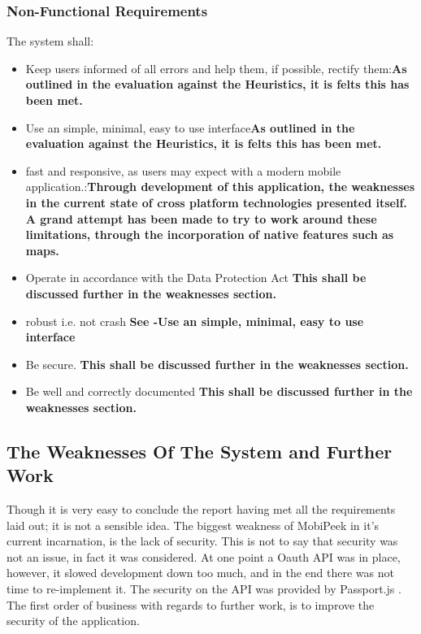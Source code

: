 \documentclass[a4paper]{article}
\begin{document}
\subsubsection{Non-Functional Requirements}
The system shall:
\begin{itemize}
\item Keep users informed of all errors and help them, if possible, rectify them:\textbf{As outlined in the evaluation against the Heuristics, it is felts this has been met.} 
\item Use an simple, minimal, easy to use interface\textbf{As outlined in the evaluation against the Heuristics, it is felts this has been met.}
\item fast and responsive, as users may expect with a modern mobile application.:\textbf{Through development of this application, the weaknesses in the current state of cross platform technologies presented itself. A grand attempt has been made to try to work around these limitations, through the incorporation of native features such as maps. }
\item Operate in accordance with the Data Protection Act \textbf{This shall be discussed further in the weaknesses section.}
\item robust i.e. not crash \textbf{See -Use an simple, minimal, easy to use interface}
\item Be secure. \textbf{This shall be discussed further in the weaknesses section.}
\item Be well and correctly documented \textbf{This shall be discussed further in the weaknesses section.}
\end{itemize}

\subsection{The Weaknesses Of The System and Further Work}

Though it is very easy to conclude the report having met all the requirements laid out; it is not a sensible idea. The biggest weakness of MobiPeek in it's current incarnation, is the lack of security. This is not to say that security was not an issue, in fact it was considered. At one point a Oauth API was in place, however, it slowed development down too much, and in the end there was not time to re-implement it. The security on the API was provided by Passport.js \cite{Passp8:online}. The first order of business with regards to further work, is to improve the security of the application.
\end{document}
